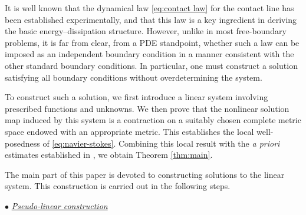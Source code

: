 \documentclass[letterpaper,reqno,10pt,twoside]{amsart}
\theoremstyle{definition}
\theoremstyle{remark}
\begin{document}
	
	It is well known that the dynamical law \eqref{eq:contact law} for the contact line has been established experimentally, and that this law is a key ingredient in deriving the basic energy--dissipation structure. However, unlike in most free-boundary problems, it is far from clear, from a PDE standpoint, whether such a law can be imposed as an independent boundary condition in a manner consistent with the other standard boundary conditions. In particular, one must construct a solution satisfying all boundary conditions without overdetermining the system.
	
	To construct such a solution, we first introduce a linear system involving prescribed functions and unknowns. We then prove that the nonlinear solution map induced by this system is a contraction on a suitably chosen complete metric space endowed with an appropriate metric. This establishes the local well-posedness of \eqref{eq:navier-stokes}. Combining this local result with the \textit{a priori} estimates established in \cite{GT2020}, we obtain Theorem \ref{thm:main}.
	
	The main part of this paper is devoted to constructing solutions to the linear system. This construction is carried out in the following steps.
	
	
	\noindent $\bullet$ \underline{\textsl{Pseudo-linear construction}}
	
\end{document}
